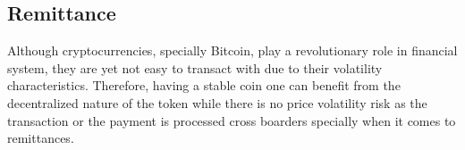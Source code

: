 %

\subsection{Remittance}

Although cryptocurrencies, specially Bitcoin, play a revolutionary role in financial system, they are yet not easy to transact with due to their volatility characteristics. Therefore, having a stable coin one can benefit from the decentralized nature of the token while there is no price volatility risk as the transaction or the payment is processed cross boarders specially when it comes to remittances.


